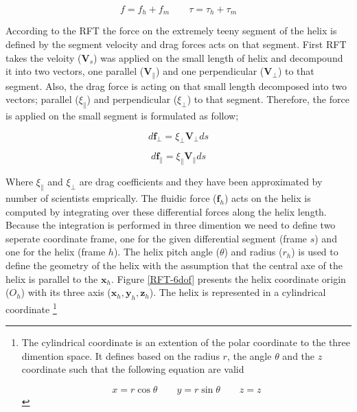 \documentclass[12pt,a4paper,titlepage]{report}
\begin{document}
\begin{equation}
 f = f_h + f_m \qquad  \tau = \tau_h + \tau_m
\label{total_force_torque}
\end{equation}

According to the \ac*{RFT} the force on the extremely teeny segment of the helix is defined by 
the segment velocity and drag forces acts on that segment. First \ac*{RFT} takes the
 veloity ($\bm{V}_s$) was applied on the small length
of helix and decompound it into two vectors, one parallel ($\bm{V}_{\parallel}$) and one perpendicular ($\bm{V}_{\perp}$)
 to that segment. Also, the drag force is acting on that small length decomposed into two 
vectors; parallel (${\xi}_{\parallel}$) and perpendicular (${\xi}_{\perp}$) to that segment.  
Therefore, the force is applied on the small segment is formulated as follow; 

\begin{equation}
 d{\bm{f}_{\perp}} = {\xi}_{\perp}{\bm{V}_{\perp}}ds 
\label{relation-force_drag}
\end{equation}

\begin{equation}
 d{\bm{f}_{\parallel}} = {\xi}_{\parallel}{\bm{V}_{\parallel}}ds
\label{relation-force_drag}
\end{equation}

Where ${\xi}_{\parallel}$ and ${\xi}_{\perp}$ are drag coefficients and they have been approximated by number
of scientists emprically. The fluidic force ($ \bm{f}_h$) acts on the helix is computed by integrating over these 
differential forces along the helix length. Because the integration is performed in three dimention
 we need to define two seperate coordinate frame, one for the given
differential segment (frame $s$) and one for the helix (frame $h$). The helix pitch angle ($\theta$) 
and radius ($r_h$) is used to define the geometry of the helix with the assumption that the central
 axe of the helix is
parallel to the $\bm{x}_h$. Figure \ref{RFT-6dof} presents the helix coordinate origin ($O_h$) with 
its three axis ($\bm{x}_h , \bm{y}_h , \bm{z}_h$). The helix is represented in a cylindrical coordinate
\footnote{The cylindrical coordinate is an extention of the polar coordinate to the three dimention space. It
defines based on the radius $r$, the angle $\theta$ and the $z$ coordinate such that the following equation
are valid

\begin{equation}
 x = r\cos{\theta} \qquad  y = r\sin{\theta}  \qquad  z = z
\label{cylindrical_coordinate}
\end{equation}
}
\end{document}
